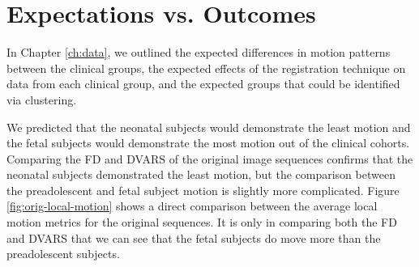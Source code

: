 \section{Expectations vs. Outcomes}

In Chapter \ref{ch:data}, we outlined the expected differences in motion patterns between the clinical groups, the expected effects of the registration technique on data from each clinical group, and the expected groups that could be identified via clustering.

We predicted that the neonatal subjects would demonstrate the least motion and the fetal subjects would demonstrate the most motion out of the clinical cohorts. Comparing the FD and DVARS of the original image sequences confirms that the neonatal subjects demonstrated the least motion, but the comparison between the preadolescent and fetal subject motion is slightly more complicated. Figure \ref{fig:orig-local-motion} shows a direct comparison between the average local motion metrics for the original sequences. It is only in comparing both the FD and DVARS that we can see that the fetal subjects do move more than the preadolescent subjects.

